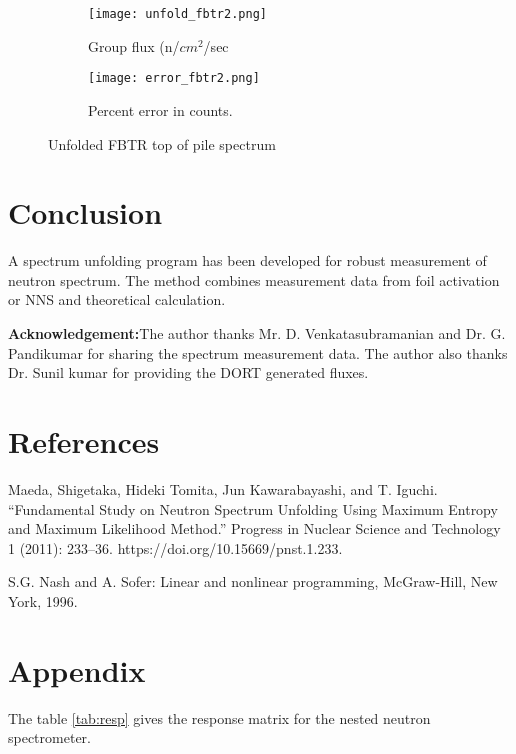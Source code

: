 \documentclass[review]{elsarticle}
\begin{document}
\begin{figure}[h!]
	\centering
	\begin{subfigure}[b]{0.8\linewidth}
		\texttt{[image: unfold\_fbtr2.png]}
		\caption{Group flux (n/$cm^2$/sec}
	\end{subfigure}
	\begin{subfigure}[b]{0.8\linewidth}
		\texttt{[image: error\_fbtr2.png]}
		\caption{Percent error in counts.}
	\end{subfigure}
	\caption{Unfolded FBTR top of pile spectrum}
	\label{fig:fbtr}
\end{figure}


\section{Conclusion}

A spectrum unfolding program has been developed for robust measurement of neutron spectrum. The method combines measurement data from foil activation or NNS and theoretical calculation.

\hspace{20mm}


\textbf{Acknowledgement:}The author thanks Mr. D. Venkatasubramanian and Dr. G. Pandikumar for sharing the spectrum measurement data. The author also thanks Dr. Sunil kumar for providing the DORT generated fluxes.


\newpage
\section{References}

\begin{thebibliography}{widestlabel}

Maeda, Shigetaka, Hideki Tomita, Jun Kawarabayashi, and T. Iguchi. “Fundamental Study on Neutron Spectrum Unfolding Using Maximum Entropy and Maximum Likelihood Method.” Progress in Nuclear Science and Technology 1 (2011): 233–36. https://doi.org/10.15669/pnst.1.233.

S.G. Nash and A. Sofer: Linear and nonlinear programming, McGraw-Hill, New York, 1996.



\end{thebibliography}



\newpage
\section{Appendix}
The table \ref{tab:resp} gives the response matrix for the nested neutron spectrometer.
\end{document}
